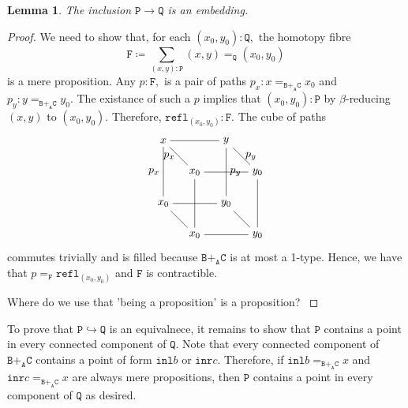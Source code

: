 \documentclass[12pt]{amsart}
\newcommand{\bydef}{\coloneqq}
\newcommand{\edit}[1]{{\color{red} #1 }}
\newcommand{\type}[1]{\mathtt{#1}}
\newcommand{\tin}{\colon}
\newcommand{\A}{\type{A}}
\newcommand{\B}{\type{B}}
\newcommand{\C}{\type{C}}
\renewcommand{\P}{\type{P}}
\newcommand{\Q}{\type{Q}}
\newcommand{\BAC}{\B +_{\A} \C}
\newcommand{\inl}{\type{inl}}
\newcommand{\inr}{\type{inr}}
\newcommand{\refl}{\type{refl}}
\newtheorem{lemma}{Lemma}
\theoremstyle{remark}
\theoremstyle{definition}
\begin{document}
\begin{lemma} \label{thm:inclusion-is-embedding}
%
  The inclusion
  \(
    \P \to \Q
  \)
  is an embedding.
%
\end{lemma}
\begin{proof}
%
  We need to show that, for each
  \(
     ( x_0 , y_0 ) \tin \Q,
  \)
  the homotopy fibre
  \[
     \type{F} \bydef
     \sum\limits_{ ( x,y ) \tin \P}
     ( x,y ) =_{\Q} ( x_0,y_0 )
  \]
  is a mere proposition. Any
  \(
    p \tin \type{F},
  \)
  is a pair of paths
  \(
    p_x \tin x =_{\BAC} x_0
  \)
  and
  \(
    p_y \tin y =_{\BAC} y_0.
  \)
  The existance of such a $p$ implies that 
  \(
    ( x_0,y_0 ) \tin \P
  \)
  by $ \beta $-reducing $ (x,y) $ to $ ( x_0,y_0 ) $. Therefore,
  \(
    \refl_{ ( x_0,y_0 ) } \tin \type{F}.
  \)
  The cube of paths
    \[
      \begin{tikzpicture}
        \node (1) at (0,2) {\( x \)};
        \node (2) at (2,2) {\( y \)};
        \node (3) at (1,1) {\( x_0 \)};
        \node (4) at (3,1) {\( y_0 \)};
        \node (5) at (0,0) {\( x_0 \)};
        \node (6) at (2,0) {\( y_0 \)};
        \node (7) at (1,-1) {\( x_0 \)};
        \node (8) at (3,-1) {\( y_0 \)};
        \draw [-] (1) to (2);
        \draw [-] (3) to (4);
        \draw [-] (5) to (6);
        \draw [-] (7) to (8);
        \draw [-] (1) to node [left] {\( p_x \)} (3);
        \draw [-] (2) to node [right] {\( p_y \)} (4);
        \draw [-] (5) to (7);
        \draw [-] (6) to (8);
        \draw [-] (1) to node [left] {\( p_x \)} (5);
        \draw [-] (2) to node [right] {\( p_y \)} (6);
        \draw [-] (3) to (7);
        \draw [-] (4) to (8); 
      \end{tikzpicture}
    \]
    commutes trivially and is filled because \( \BAC \) is at most a
    1-type. Hence, we have that
    \(
       p =_{ \type{F} } \refl_{ ( x_0,y_0 ) }
    \)
    and \( \type{F} \) is contractible.
    \par

    \edit{Where do we use that 'being a proposition' is a
      proposition?}
%
\end{proof}


To prove that
%
\( 
   \P \hookrightarrow \Q
\)
%
is an equivalnece, it remains to show that \( \P \) contains a point
in every connected component of \( \Q \). Note that every connected
component of \( \BAC \) contains a point of form \( \inl b \) or
\( \inr c \). Therefore, if
%
\(
   \inl b =_{\BAC} x
\)
%
and
%
\(
   \inr c =_{\BAC} x
\)
%
are always mere propositions, then \( \P \) contains a point in every
component of \( \Q \) as desired.
\par
\end{document}
